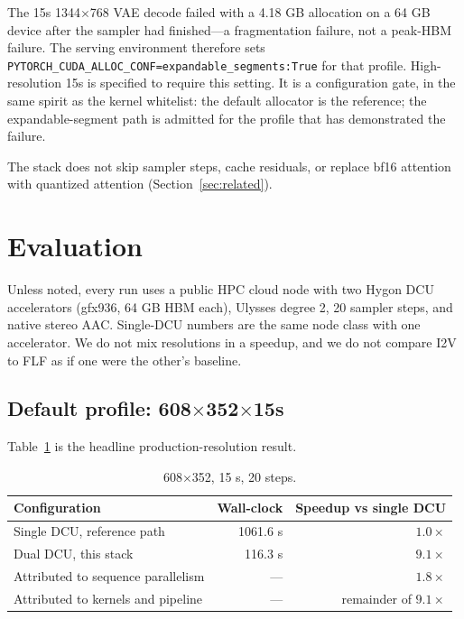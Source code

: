 \documentclass[11pt]{article}
\begin{document}
The 15s 1344$\times$768 VAE decode failed with a 4.18 GB allocation on a 64 GB device after the sampler had finished---a fragmentation failure, not a peak-HBM failure. The serving environment therefore sets \texttt{PYTORCH\_CUDA\_ALLOC\_CONF=expandable\_segments:True} for that profile. High-resolution 15s is specified to require this setting. It is a configuration gate, in the same spirit as the kernel whitelist: the default allocator is the reference; the expandable-segment path is admitted for the profile that has demonstrated the failure.

The stack does not skip sampler steps, cache residuals, or replace bf16 attention with quantized attention (Section~\ref{sec:related}).

\section{Evaluation}
\label{sec:eval}

Unless noted, every run uses a public HPC cloud node with two Hygon DCU accelerators (gfx936, 64 GB HBM each), Ulysses degree 2, 20 sampler steps, and native stereo AAC. Single-DCU numbers are the same node class with one accelerator. We do not mix resolutions in a speedup, and we do not compare I2V to FLF as if one were the other's baseline.

\subsection{\texorpdfstring{Default profile: 608$\times$352$\times$15s}{Default profile: 608x352x15s}}
\label{sec:default}

Table~\ref{tab:default} is the headline production-resolution result.

\begin{table}[htbp]
\centering
\caption{608$\times$352, 15 s, 20 steps.}
\label{tab:default}
\begin{tabular}{lrr}
\toprule
Configuration & Wall-clock & Speedup vs single DCU \\
\midrule
Single DCU, reference path & 1061.6 s & $1.0\times$ \\
Dual DCU, this stack & 116.3 s & $9.1\times$ \\
Attributed to sequence parallelism & --- & $1.8\times$ \\
Attributed to kernels and pipeline & --- & remainder of $9.1\times$ \\
\bottomrule
\end{tabular}
\end{table}
\end{document}
